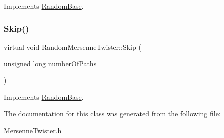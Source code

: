 Implements \hyperlink{classRandomBase_ae93f26c38d1675ef07cb1fd29b894b26}{Random\+Base}.

\hypertarget{classRandomMersenneTwister_a624044e5b2516f7947382ab38911b4a5}{}\label{classRandomMersenneTwister_a624044e5b2516f7947382ab38911b4a5} 
\subsubsection{\texorpdfstring{Skip()}{Skip()}}
{\footnotesize\ttfamily virtual void Random\+Mersenne\+Twister\+::\+Skip (\begin{DoxyParamCaption}\item[{unsigned long}]{number\+Of\+Paths }\end{DoxyParamCaption})\hspace{0.3cm}{\ttfamily [virtual]}}



Implements \hyperlink{classRandomBase_a0531f44e3e2a71d14ef1490aa5d90b77}{Random\+Base}.



The documentation for this class was generated from the following file\+:\begin{DoxyCompactItemize}
\item 
\hyperlink{MersenneTwister_8h}{Mersenne\+Twister.\+h}\end{DoxyCompactItemize}
